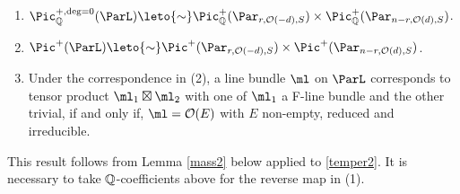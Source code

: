 \begin{lemma}
\notready\label{BachMass}
\begin{enumerate}
\item  $\Pic^{+,\deg=0}_{\Bbb{Q}}(\ParL)\leto{\sim}\Pic^+_{\Bbb{Q}}(\Par_{r,\mathcal{O}(-d),S})\times \Pic^+_{\Bbb{Q}}(\Par_{n-r,\mathcal{O}(d),S})$.
\item $\Pic^{+}(\ParL)\leto{\sim}\Pic^+(\Par_{r,\mathcal{O}(-d),S})\times \Pic^+(\Par_{n-r,\mathcal{O}(d),S})$.
\item Under the correspondence in (2), a line bundle $\ml$ on $\ParL$ corresponds to tensor product $\ml_1\boxtimes\ml_2$ with one of $\ml_1$ a F-line bundle and the other trivial, if and only if,
$\ml=\mathcal{O}(E)$ with $E$ non-empty, reduced and irreducible.

\end{enumerate}
\end{lemma}
This result follows from Lemma \ref{mass2} below applied to \eqref{temper2}.
It is necessary to take $\Bbb{Q}$-coefficients above for the reverse map in (1).






